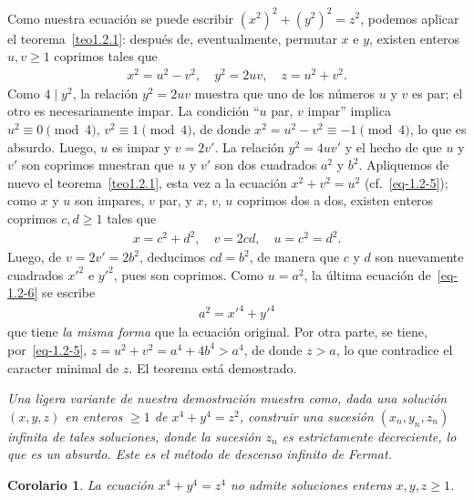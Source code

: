 \documentclass[bibtotoc,leqno,spanish]{amsbook}
\numberwithin{equation}{section}
\newenvironment{comm}%
	{\begin{list}{}{\setlength{\leftmargin}{2\parindent}\setlength{\topsep}{\baselineskip}}\item\itshape}
	{\end{list}}
\theoremstyle{note}
\theoremstyle{note}
\newtheorem*{corollary*}{Corolario}
\theoremstyle{rem}
\numberwithin{theorem}{section}
\numberwithin{proposition}{section}
\numberwithin{definition}{section}
\numberwithin{lemma}{section}
\numberwithin{corollary}{section}
\numberwithin{example}{section}
\numberwithin{footnote}{section}%
\begin{document}
Como nuestra
ecuaci\'on se puede escribir $(x^{2})^{2}+(y^{2})^{2}=z^{2}$, podemos aplicar el teorema~\ref{teo1.2.1}: despu\'es
de, eventualmente, permutar $x$ e $y$, existen enteros $u, v\geq 1$ coprimos tales que
\begin{gather}\label{eq-1.2-5}
x^{2} = u^{2}-v^{2},\quad y^{2} = 2uv,\quad z = u^{2}+v^{2}.
\end{gather}
Como $4\mid y^{2}$, la relaci\'on $y^{2} = 2uv$ muestra que uno de los n\'umeros $u$ y $v$ es
par; el otro es necesariamente impar. La condici\'on ``$u$ par, $v$ impar'' implica
$u^{2}\equiv 0\pmod 4$, $v^{2}\equiv 1\pmod 4$, de donde $x^{2}=u^{2}-v^{2}\equiv -1\pmod 4$,
lo que es absurdo. Luego, $u$ es impar y $v = 2v'$. La relaci\'on $y^{2} = 4uv'$ y el hecho
de que $u$ y $v'$ son coprimos muestran que $u$ y $v'$ son dos cuadrados $a^{2}$ y $b^{2}$.
Apliquemos de nuevo el teorema~\ref{teo1.2.1}, esta vez a la ecuaci\'on $x^{2}+v^{2} = u^{2}$ (cf.~\eqref{eq-1.2-5});
como $x$ y $u$ son impares, $v$ par, y $x$, $v$, $u$ coprimos dos a dos, existen enteros coprimos
$c,d\geq 1$ tales que
\begin{gather}\label{eq-1.2-6}
x = c^{2}+d^{2},\quad v = 2cd,\quad u=c^{2}=d^{2}.
\end{gather}
Luego, de $v = 2v' = 2b^{2}$, deducimos $cd = b^{2}$, de manera que $c$ y $d$ son nuevamente
cuadrados $x'^{2}$ e $y'^{2}$, pues son coprimos. Como $u=a^{2}$, la \'ultima ecuaci\'on de~\eqref{eq-1.2-6}
se escribe
\begin{gather}
a^{2} = x'^{4}+y'^{4}
\end{gather}
que tiene {\em la misma forma} que la ecuaci\'on original. Por otra parte, se tiene, por~\eqref{eq-1.2-5},
$z = u^{2}+v^{2} = a^{4}+4b^{4} > a^{4}$, de donde $z > a$, lo que contradice el caracter minimal
de $z$. El teorema est\'a demostrado.

\begin{comm}
Una ligera variante de nuestra demostraci\'on muestra como, dada una soluci\'on $(x,y,z)$
en enteros $\geq 1$ de $x^{4}+y^{4}=z^{2}$, construir una sucesi\'on $(x_{n},y_{n},z_{n})$
infinita de tales soluciones, donde la sucesi\'on $z_{n}$ es estrictamente decreciente, lo
que es un absurdo. Este es el m\'etodo de {\em descenso infinito} de Fermat.
\end{comm}

\begin{corollary*}
La ecuaci\'on $x^{4}+y^{4}=z^{4}$ no admite soluciones enteras $x,y,z\geq 1$.
\end{corollary*}
\end{document}
